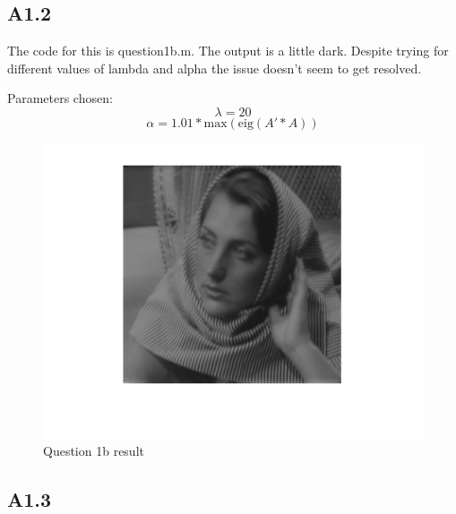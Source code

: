 \documentclass{article}
\begin{document}

\subsection*{A1.2}

The code for this is question1b.m. The output is a little dark. Despite trying for different values of lambda and alpha the issue doesn't seem to get resolved.

Parameters chosen:
$$\lambda = 20$$
$$\alpha = 1.01*\text{max}(\text{eig}(A'*A))$$

\begin{figure}[h]
	\centering
	\includegraphics{html/mainScript_02.png}
	\caption{Question 1b result}
	\label{Fig :1b}
\end{figure}


\subsection*{A1.3}
\end{document}

